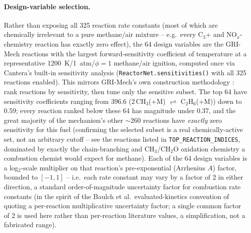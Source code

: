 \documentclass[11pt]{article}
\begin{document}
\paragraph{Design-variable selection.} Rather than exposing all 325
reaction rate constants (most of which are chemically irrelevant to a
pure methane/air mixture -- e.g.\ every C$_3$+ and NO$_x$-chemistry
reaction has exactly zero effect), the 64 design variables are the
GRI-Mech reactions with the largest forward-sensitivity coefficient of
temperature at a representative 1200~K/1~atm/$\phi=1$ methane/air
ignition, computed once via Cantera's built-in sensitivity analysis
(\texttt{ReactorNet.sensitivities()} with all 325 reactions enabled).
This mirrors GRI-Mech's own construction methodology
\citep{frenklach1992solutionmapping}: rank reactions by sensitivity,
then tune only the sensitive subset. The top 64 have sensitivity
coefficients ranging from 396.6 (2\,CH$_3$(+M) $\rightleftharpoons$
C$_2$H$_6$(+M)) down to 0.59; every reaction ranked below these 64 has
magnitude under 0.37, and the great majority of the mechanism's other
$\sim$260 reactions have \emph{exactly} zero sensitivity for this fuel
(confirming the selected subset is a real chemically-active set, not an
arbitrary cutoff -- see the reactions listed in
\texttt{TOP\_REACTION\_INDICES}, dominated by exactly the chain-branching
and CH$_3$/CH$_2$O oxidation chemistry a combustion chemist would
expect for methane). Each of the 64 design variables is a log$_2$-scale
multiplier on that reaction's pre-exponential (Arrhenius $A$) factor,
bounded to $[-1, 1]$ -- i.e.\ each rate constant may vary by a factor of
2 in either direction, a standard order-of-magnitude uncertainty factor
for combustion rate constants (in the spirit of the Baulch et al.\
evaluated-kinetics convention of quoting a per-reaction multiplicative
uncertainty factor; a single common factor of 2 is used here rather than
per-reaction literature values, a simplification, not a fabricated
range).
\end{document}
